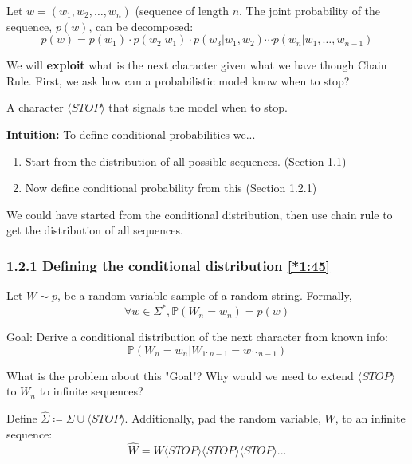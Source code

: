 \documentclass[12pt, twoside]{article}
\begin{document}
\begin{definition} \label{def:1.2}
Let $w = (w_1, w_2, \dots, w_n)$ (sequence of length $n$. The joint probability of the sequence, $p(w)$, can be decomposed:
\[ p(w) = p(w_1) \cdot p(w_2 | w_1) \cdot p(w_3 | w_1, w_2) \cdots p(w_n | w_1, \dots, w_{n-1}) \]
\end{definition}

We will \textbf{exploit} what is the next character given what we have though Chain Rule. First, we ask how can a probabilistic model know when to stop?



\begin{definition}
A character $\langle STOP \rangle$ that signals the model when to stop.
\end{definition}

\textbf{Intuition:} To define conditional probabilities we...
\begin{enumerate}
    \item Start from the distribution of all possible sequences. (Section 1.1)
    \item Now define conditional probability from this (Section 1.2.1)
\end{enumerate}

\begin{remark} 
    We could have started from the conditional distribution, then use chain rule to get the distribution of all sequences.
\end{remark}

\subsubsection*{1.2.1 Defining the conditional distribution \href{https://youtu.be/DR8bQPoRlX8?si=YfpqZSf6sS3tfome&t=105}{[*1:45]}}

Let $W\sim p$, be a random variable sample of a random string. Formally, $$\forall w \in\Sigma^*, \mathbb{P}(W_n = w_n)=p(w)$$

Goal: Derive a conditional distribution of the next character from known info:
$$\mathbb{P}(W_n=w_n|W_{1:n-1}=w_{1:n-1})$$

\begin{exercise} \label{ex:1.3}
 What is the problem about this "Goal"? Why would we need to extend $\langle STOP \rangle$ to $W_n$ to infinite sequences?
\end{exercise}

\begin{definition}
    Define $\hat{\Sigma} \coloneqq \Sigma \cup \langle STOP \rangle$. Additionally, pad the random variable, $W$, to an infinite sequence:
    $$\hat{W}=W\langle STOP \rangle\langle STOP \rangle\langle STOP \rangle...$$
\end{definition}
\end{document}

